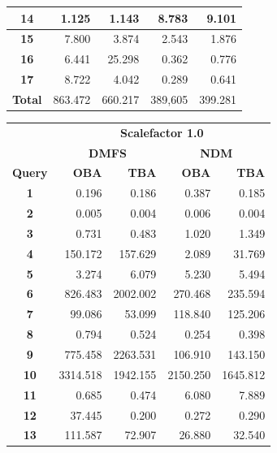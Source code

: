 \documentclass[a4paper]{article}
\begin{document}
{\begin{figure}[h]
\begin{minipage}{0.5\linewidth}
\begin{tiny}
\begin{tabular}{|c|r|r|r|r|}
        \hline
        \textbf{14}&1.125&1.143&8.783&9.101\\
        \hline
        \textbf{15}&7.800&3.874&2.543&1.876\\
        \hline
        \textbf{16}&6.441&25.298&0.362&0.776\\
        \hline
        \textbf{17}&8.722&4.042&0.289&0.641\\
        \hline
        \textbf{Total}&863.472&660.217&389,605&399.281\\
        \hline
      \end{tabular}
    \end{tiny}
  \end{minipage}\hfill
\begin{minipage}{0.5\linewidth}
    \begin{tiny}
      \begin{tabular}{|c|r|r|r|r|}
        \hline
        &\multicolumn{4}{c|}{\textbf{Scalefactor 1.0}}\\
        \cline{2-5}
        &\multicolumn{2}{c|}{\textbf{DMFS}}&\multicolumn{2}{c|}{\textbf{NDM}}\\
        \hline
        \textbf{Query}&\textbf{OBA}&\textbf{TBA}&\textbf{OBA}&\textbf{TBA}\\
        \hline
        \textbf{1}&0.196&0.186&0.387&0.185\\
        \hline
        \textbf{2}&0.005&0.004&0.006&0.004\\
        \hline
        \textbf{3}&0.731&0.483&1.020&1.349\\
        \hline
        \textbf{4}&150.172&157.629&2.089&31.769\\
        \hline
         \textbf{5}&3.274&6.079&5.230&5.494\\
        \hline
        \textbf{6}&826.483&2002.002&270.468&235.594\\
        \hline
        \textbf{7}&99.086&53.099&118.840&125.206\\
        \hline
        \textbf{8}&0.794&0.524&0.254&0.398\\
        \hline
        \textbf{9}&775.458&2263.531&106.910&143.150\\
        \hline
        \textbf{10}&3314.518&1942.155&2150.250&1645.812\\
        \hline
        \textbf{11}&0.685&0.474&6.080&7.889\\
        \hline
        \textbf{12}&37.445&0.200&0.272&0.290\\
        \hline
        \textbf{13}&111.587&72.907&26.880&32.540\\

\end{tabular}
\end{tiny}
\end{minipage}
\end{figure}}
\end{document}
